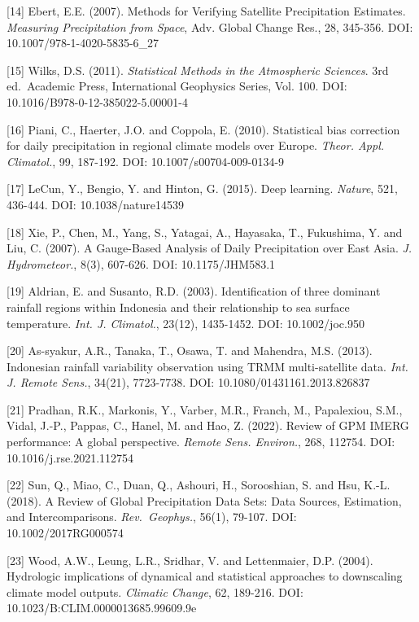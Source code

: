 \documentclass[
]{article}
\begin{document}
{[}14{]} Ebert, E.E. (2007). Methods for Verifying Satellite
Precipitation Estimates. \emph{Measuring Precipitation from Space}, Adv.
Global Change Res., 28, 345-356. DOI: 10.1007/978-1-4020-5835-6\_27

{[}15{]} Wilks, D.S. (2011). \emph{Statistical Methods in the
Atmospheric Sciences}. 3rd ed.~Academic Press, International Geophysics
Series, Vol. 100. DOI: 10.1016/B978-0-12-385022-5.00001-4

{[}16{]} Piani, C., Haerter, J.O. and Coppola, E. (2010). Statistical
bias correction for daily precipitation in regional climate models over
Europe. \emph{Theor. Appl. Climatol.}, 99, 187-192. DOI:
10.1007/s00704-009-0134-9

{[}17{]} LeCun, Y., Bengio, Y. and Hinton, G. (2015). Deep learning.
\emph{Nature}, 521, 436-444. DOI: 10.1038/nature14539

{[}18{]} Xie, P., Chen, M., Yang, S., Yatagai, A., Hayasaka, T.,
Fukushima, Y. and Liu, C. (2007). A Gauge-Based Analysis of Daily
Precipitation over East Asia. \emph{J. Hydrometeor.}, 8(3), 607-626.
DOI: 10.1175/JHM583.1

{[}19{]} Aldrian, E. and Susanto, R.D. (2003). Identification of three
dominant rainfall regions within Indonesia and their relationship to sea
surface temperature. \emph{Int. J. Climatol.}, 23(12), 1435-1452. DOI:
10.1002/joc.950

{[}20{]} As-syakur, A.R., Tanaka, T., Osawa, T. and Mahendra, M.S.
(2013). Indonesian rainfall variability observation using TRMM
multi-satellite data. \emph{Int. J. Remote Sens.}, 34(21), 7723-7738.
DOI: 10.1080/01431161.2013.826837

{[}21{]} Pradhan, R.K., Markonis, Y., Varber, M.R., Franch, M.,
Papalexiou, S.M., Vidal, J.-P., Pappas, C., Hanel, M. and Hao, Z.
(2022). Review of GPM IMERG performance: A global perspective.
\emph{Remote Sens. Environ.}, 268, 112754. DOI:
10.1016/j.rse.2021.112754

{[}22{]} Sun, Q., Miao, C., Duan, Q., Ashouri, H., Sorooshian, S. and
Hsu, K.-L. (2018). A Review of Global Precipitation Data Sets: Data
Sources, Estimation, and Intercomparisons. \emph{Rev.~Geophys.}, 56(1),
79-107. DOI: 10.1002/2017RG000574

{[}23{]} Wood, A.W., Leung, L.R., Sridhar, V. and Lettenmaier, D.P.
(2004). Hydrologic implications of dynamical and statistical approaches
to downscaling climate model outputs. \emph{Climatic Change}, 62,
189-216. DOI: 10.1023/B:CLIM.0000013685.99609.9e
\end{document}
